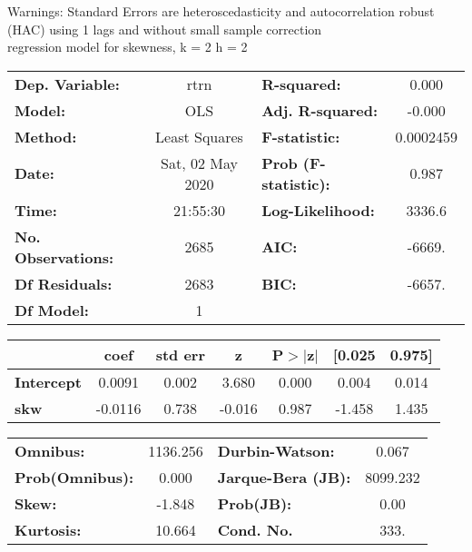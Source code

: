 Warnings: \newline
 [1] Standard Errors are heteroscedasticity and autocorrelation robust (HAC) using 1 lags and without small sample correction\\ 

regression model for skewness, k = 2 h = 2\begin{center}
\begin{tabular}{lclc}
\toprule
\textbf{Dep. Variable:}    &       rtrn       & \textbf{  R-squared:         } &     0.000   \\
\textbf{Model:}            &       OLS        & \textbf{  Adj. R-squared:    } &    -0.000   \\
\textbf{Method:}           &  Least Squares   & \textbf{  F-statistic:       } & 0.0002459   \\
\textbf{Date:}             & Sat, 02 May 2020 & \textbf{  Prob (F-statistic):} &    0.987    \\
\textbf{Time:}             &     21:55:30     & \textbf{  Log-Likelihood:    } &    3336.6   \\
\textbf{No. Observations:} &        2685      & \textbf{  AIC:               } &    -6669.   \\
\textbf{Df Residuals:}     &        2683      & \textbf{  BIC:               } &    -6657.   \\
\textbf{Df Model:}         &           1      & \textbf{                     } &             \\
\bottomrule
\end{tabular}
\begin{tabular}{lcccccc}
                   & \textbf{coef} & \textbf{std err} & \textbf{z} & \textbf{P$> |$z$|$} & \textbf{[0.025} & \textbf{0.975]}  \\
\midrule
\textbf{Intercept} &       0.0091  &        0.002     &     3.680  &         0.000        &        0.004    &        0.014     \\
\textbf{skw}       &      -0.0116  &        0.738     &    -0.016  &         0.987        &       -1.458    &        1.435     \\
\bottomrule
\end{tabular}
\begin{tabular}{lclc}
\textbf{Omnibus:}       & 1136.256 & \textbf{  Durbin-Watson:     } &    0.067  \\
\textbf{Prob(Omnibus):} &   0.000  & \textbf{  Jarque-Bera (JB):  } & 8099.232  \\
\textbf{Skew:}          &  -1.848  & \textbf{  Prob(JB):          } &     0.00  \\
\textbf{Kurtosis:}      &  10.664  & \textbf{  Cond. No.          } &     333.  \\
\bottomrule
\end{tabular}
\end{center}

